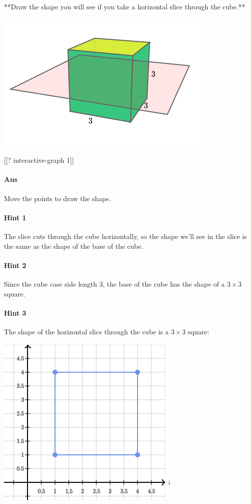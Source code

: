 \documentclass[twocolumn,10pt]{article}
\def\shrinkfactor{0.55}
\begin{document}
**Draw the shape you will see if you take a horizontal slice through the cube.**


\includegraphics[scale=\shrinkfactor]{figures/f0b7654c0b53908504fb120f51f2b50f3f8fd955.png}

[[? interactive-graph 1]]




\paragraph{Ans} Move the points to draw the shape. 

\paragraph{Hint 1}The slice cuts through the cube horizontally, so the shape we'll see in the slice is the same as the shape of the base of the cube.

\paragraph{Hint 2}Since the cube case side length $3$, the base of the cube has the shape of a $3 \times 3$ square. 


\paragraph{Hint 3}The shape of the horizontal slice through the cube is a $3 \times 3$ square:  

\includegraphics[scale=\shrinkfactor]{figures/cb2ed34a4e2c927dc5486305caad138960eaf2e0.png}
\end{document}
